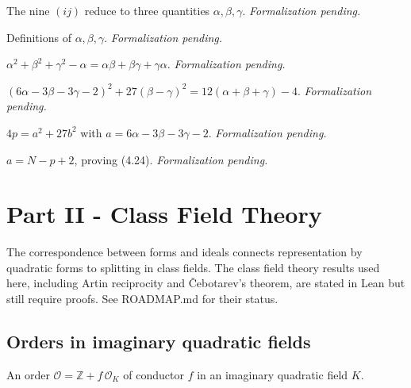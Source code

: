\begin{theorem}[Exercise 4.29(c)]
  \label{exr:s4_29_c}
  \notready
  The nine $(ij)$ reduce to three quantities $\alpha,\beta,\gamma$. \emph{Formalization pending.}
\end{theorem}

\begin{theorem}[Exercise 4.29(d)]
  \label{exr:s4_29_d}
  \notready
  Definitions of $\alpha,\beta,\gamma$. \emph{Formalization pending.}
\end{theorem}

\begin{theorem}[Exercise 4.29(e)]
  \label{exr:s4_29_e}
  \notready
  $\alpha^2+\beta^2+\gamma^2-\alpha = \alpha\beta+\beta\gamma+\gamma\alpha$.
  \emph{Formalization pending.}
\end{theorem}

\begin{theorem}[Exercise 4.29(f)]
  \label{exr:s4_29_f}
  \notready
  $(6\alpha-3\beta-3\gamma-2)^2 + 27(\beta-\gamma)^2 = 12(\alpha+\beta+\gamma)-4$.
  \emph{Formalization pending.}
\end{theorem}

\begin{theorem}[Exercise 4.29(g)]
  \label{exr:s4_29_g}
  \notready
  $4p = a^2 + 27b^2$ with $a = 6\alpha-3\beta-3\gamma-2$. \emph{Formalization pending.}
\end{theorem}

\begin{theorem}[Exercise 4.29(h)]
  \label{exr:s4_29_h}
  \notready
  $a = N - p + 2$, proving (4.24). \emph{Formalization pending.}
\end{theorem}

\chapter{Part II - Class Field Theory}

The correspondence between forms and ideals connects representation by quadratic
forms to splitting in class fields. The class field theory results used here,
including Artin reciprocity and Čebotarev's theorem, are stated in Lean but still
require proofs. See ROADMAP.md for their status.

\section{Orders in imaginary quadratic fields}

\begin{definition}[Order]
  \label{def:quad_order}
  \leanok
  An order $\mathcal O = \mathbb Z + f\,\mathcal O_K$ of conductor $f$ in an
  imaginary quadratic field $K$.
\end{definition}

